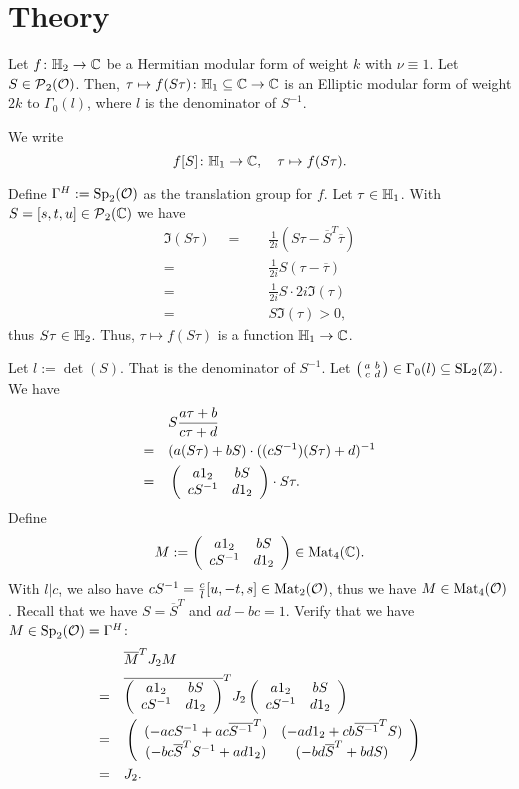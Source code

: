 
\section{Theory}


\begin{lemma}
Let $f \colon \mathbb{H}_2 \rightarrow \mathbb{C}$ be a Hermitian modular form of weight $k$ with $\nu \equiv 1$. Let $S \in \operatorname{\mathcal{P}}_2(\mathcal{O})$.
Then, $\tau \mapsto f(S \tau) \colon \mathbb{H}_1 \subseteq \mathbb{C} \rightarrow \mathbb{C}$ is an Elliptic modular form of weight $2k$ to $\Gamma_0(l)$, where $l$ is the denominator of $S^{-1}$.  %

We write
\[  f[S] \colon \mathbb{H}_1 \rightarrow \mathbb{C}, \quad \tau \mapsto f(S \tau) . \]

\proof
Define $\Gamma^H := \operatorname{Sp}_2(\mathcal{O})$ as the translation group for $f$.
Let $\tau \in \mathbb{H}_1$. With $S = [s,t,u] \in \operatorname{\mathcal{P}}_2(\mathbb{C})$ we have
\begin{align*}
\Im(S\tau) \quad = \quad& \frac{1}{2i} \left( S \tau - \overline{S}^T \overline{\tau} \right) \\
= \quad & \frac{1}{2i} S (\tau - \overline{\tau}) \\
= \quad & \frac{1}{2i} S \cdot 2i \Im(\tau) \\
= \quad & S \Im(\tau) > 0 ,
\end{align*}
thus $S \tau \in \mathbb{H}_2$. Thus, $\tau \mapsto f(S \tau)$ is a function $\mathbb{H}_1 \rightarrow \mathbb{C}$.

Let $l := \det(S)$. That is the denominator of $S^{-1}$. Let $\left( \begin{smallmatrix} a & b \\ c & d \end{smallmatrix} \right) \in \Gamma_0(l) \subseteq \operatorname{SL}_2(\mathbb{Z})$. We have
\begin{align*}
& S \frac{a \tau + b}{c \tau + d} \\
=\quad & (a (S \tau) + bS) \cdot ((c S^{-1}) (S \tau) + d)^{-1} \\
=\quad & \left( \begin{array}{cc} a 1_2 & b S \\ c S^{-1} & d 1_2 \end{array} \right) \cdot S \tau .
\end{align*}
Define
\[ M := \left( \begin{array}{cc} a 1_2 & b S \\ c S^{-1} & d 1_2 \end{array} \right) \in \operatorname{Mat}_4(\mathbb{C}) . \]
With $l | c$, we also have $c S^{-1} = \frac{c}{l} [u, -t, s] \in \operatorname{Mat}_2(\mathcal{O})$, thus we have $M \in \operatorname{Mat}_4(\mathcal{O})$.
Recall that we have $S = \overline{S}^T$ and $ad  - bc = 1$. Verify that we have $M \in \operatorname{Sp}_2(\mathcal{O}) = \Gamma^H$:
\begin{align*}
&  \overline{M}^T J_2 M \\
=\quad & \overline{\left( \begin{array}{cc} a 1_2 & b S \\ c S^{-1} & d 1_2 \end{array} \right)}^T J_2 \left( \begin{array}{cc} a 1_2 & b S \\ c S^{-1} & d 1_2 \end{array} \right) \\
=\quad & \left( \begin{array}{cc} (-ac S^{-1} + ac \overline{S^{-1}}^T) & (-ad 1_2 + cb \overline{S^{-1}}^T S) \\ (-bc \overline{S}^T S^{-1} + ad 1_2) & (-bd \overline{S}^T + bd S) \end{array} \right) \\
=\quad & J_2 .
\end{align*}


\end{lemma}
